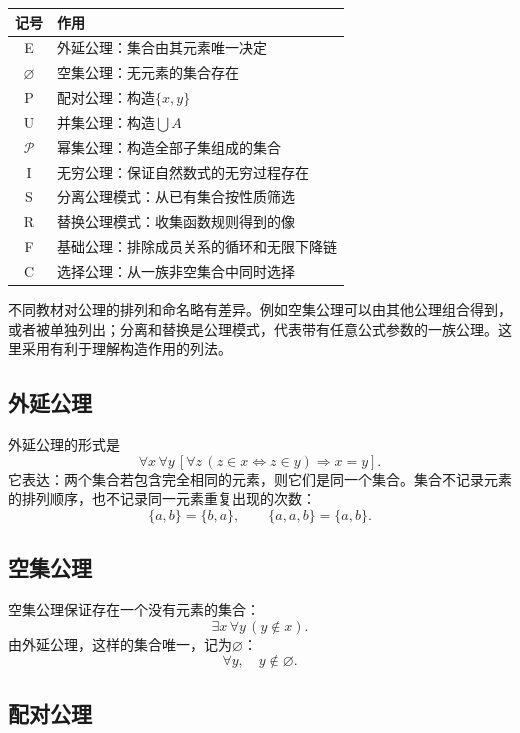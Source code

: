 \begin{center}
\begin{tabular}{c|l}
    \toprule
    记号 & 作用\\
    \midrule
    E & 外延公理：集合由其元素唯一决定\\
    $\varnothing$ & 空集公理：无元素的集合存在\\
    P & 配对公理：构造$\{x,y\}$\\
    U & 并集公理：构造$\bigcup A$\\
    $\mathcal P$ & 幂集公理：构造全部子集组成的集合\\
    I & 无穷公理：保证自然数式的无穷过程存在\\
    S & 分离公理模式：从已有集合按性质筛选\\
    R & 替换公理模式：收集函数规则得到的像\\
    F & 基础公理：排除成员关系的循环和无限下降链\\
    C & 选择公理：从一族非空集合中同时选择\\
    \bottomrule
\end{tabular}
\end{center}

不同教材对公理的排列和命名略有差异。例如空集公理可以由其他公理组合得到，或者被单独列出；分离和替换是公理模式，代表带有任意公式参数的一族公理。这里采用有利于理解构造作用的列法。

\subsection{外延公理}

外延公理的形式是
\[
    \forall x\,\forall y\,
    \left[
    \forall z\,(z\in x\Leftrightarrow z\in y)
    \Rightarrow x=y
    \right].
\]
它表达：两个集合若包含完全相同的元素，则它们是同一个集合。集合不记录元素的排列顺序，也不记录同一元素重复出现的次数：
\[
    \{a,b\}=\{b,a\},
    \qquad
    \{a,a,b\}=\{a,b\}.
\]

\subsection{空集公理}

空集公理保证存在一个没有元素的集合：
\[
    \exists x\,\forall y\,(y\notin x).
\]
由外延公理，这样的集合唯一，记为$\varnothing$：
\[
    \forall y,\quad y\notin\varnothing.
\]

\subsection{配对公理}

